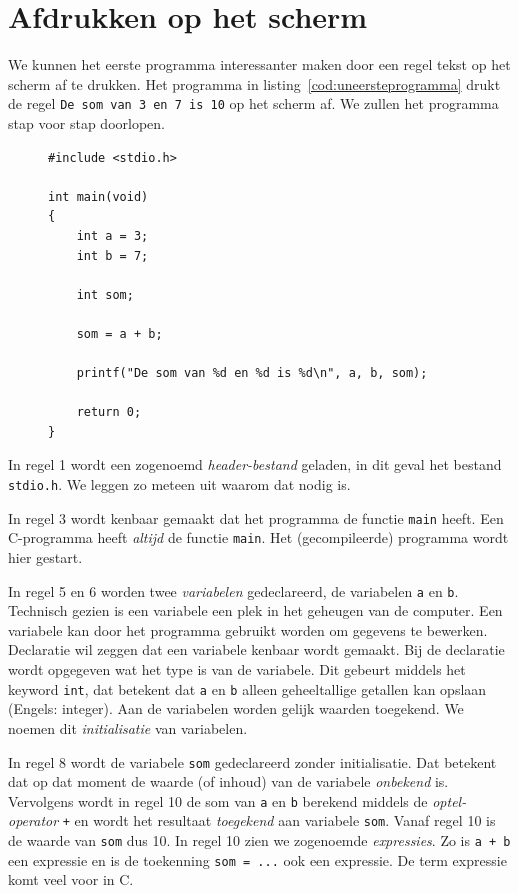 \section{Afdrukken op het scherm}
We kunnen het eerste programma interessanter maken door een regel tekst op het scherm af te drukken. Het programma in listing~\ref{cod:uneersteprogramma} drukt de regel \texttt{De som van 3 en 7 is 10} op het scherm af. We zullen het programma stap voor stap doorlopen.

\begin{figure}[!ht]
\begin{lstlisting}[caption=Afdrukken van de som van twee getallen.,label=cod:uneersteprogramma]
#include <stdio.h>

int main(void)
{
    int a = 3;
    int b = 7;

    int som;

    som = a + b;

	printf("De som van %d en %d is %d\n", a, b, som);

	return 0;
}
\end{lstlisting}
\end{figure}

In regel 1 wordt een zogenoemd \textsl{header-bestand} geladen, in dit geval het bestand \texttt{stdio.h}. We leggen zo meteen uit waarom dat nodig is.

In regel 3 wordt kenbaar gemaakt dat het programma de functie \texttt{main} heeft. Een C-programma heeft \textsl{altijd} de functie \texttt{main}. Het (gecompileerde) programma wordt hier gestart.

In regel 5 en 6 worden twee \textsl{variabelen} gedeclareerd, de variabelen \texttt{a} en \texttt{b}. Technisch gezien is een variabele een plek in het geheugen van de computer. Een variabele kan door het programma gebruikt worden om gegevens te bewerken. Declaratie wil zeggen dat een variabele kenbaar wordt gemaakt. Bij de declaratie wordt opgegeven wat het type is van de variabele. Dit gebeurt middels het keyword \texttt{int}, dat betekent dat \texttt{a} en \texttt{b} alleen geheeltallige getallen kan opslaan (Engels: integer). Aan de variabelen worden gelijk waarden toegekend. We noemen dit \textsl{initialisatie} van variabelen.

In regel 8 wordt de variabele \texttt{som} gedeclareerd zonder initialisatie. Dat betekent dat op dat moment de waarde (of inhoud) van de variabele \textsl{onbekend} is. Vervolgens wordt in regel 10 de som van \texttt{a} en \texttt{b} berekend middels de \textsl{optel-operator} \texttt{+}\indexop{+} en wordt het resultaat \textsl{toegekend}\indexop{=} aan variabele \texttt{som}. Vanaf regel 10 is de waarde van \texttt{som} dus 10. In regel 10 zien we zogenoemde \textsl{expressies}. Zo is \texttt{a + b} een expressie en is de toekenning \mbox{\texttt{som = ...}} ook een expressie. De term expressie komt veel voor in C.

